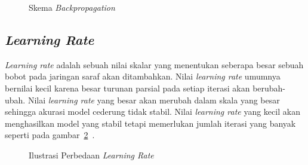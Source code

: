 \begin{figure}[htbp]
    \begin{center}
    \end{center}
    \vspace{-20pt}
    \captionsetup{labelfont=bf, textfont=bf}
    \caption{Skema \textit{Backpropagation}}
    \vspace{-10pt}
    \captionsetup{labelfont=md, textfont=md}
    \label{fig:backprop}
\end{figure}

\subsection{\textit{Learning Rate}}

\textit{Learning rate} adalah sebuah nilai skalar yang menentukan seberapa besar sebuah bobot pada
jaringan saraf akan ditambahkan. Nilai \textit{learning rate} umumnya bernilai kecil karena
besar turunan parsial pada setiap iterasi akan berubah-ubah. Nilai \textit{learning rate} yang besar
akan merubah dalam skala yang besar sehingga akurasi model cederung tidak stabil. Nilai
\textit{learning rate} yang kecil akan menghasilkan model yang stabil tetapi memerlukan jumlah iterasi
yang banyak seperti pada gambar~\ref{fig:lr}~\cite{2019arXiv190801878Y}.

\begin{figure}[htbp]
    \begin{center}
    \end{center}
    \vspace{-20pt}
    \captionsetup{labelfont=bf, textfont=bf}
    \caption{Ilustrasi Perbedaan \textit{Learning Rate}}
    \vspace{-10pt}
    \captionsetup{labelfont=md, textfont=md}
    \label{fig:lr}
\end{figure}

